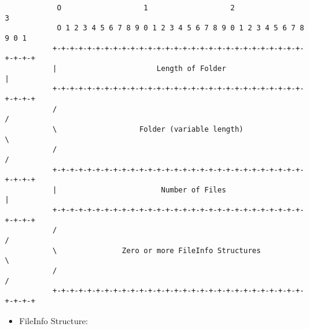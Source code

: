 \begin{verbatim}
            O                   1                   2                   3
            O 1 2 3 4 5 6 7 8 9 0 1 2 3 4 5 6 7 8 9 0 1 2 3 4 5 6 7 8 9 0 1
           +-+-+-+-+-+-+-+-+-+-+-+-+-+-+-+-+-+-+-+-+-+-+-+-+-+-+-+-+-+-+-+-+
           |                       Length of Folder                        |
           +-+-+-+-+-+-+-+-+-+-+-+-+-+-+-+-+-+-+-+-+-+-+-+-+-+-+-+-+-+-+-+-+
           /                                                               /
           \                   Folder (variable length)                    \
           /                                                               /
           +-+-+-+-+-+-+-+-+-+-+-+-+-+-+-+-+-+-+-+-+-+-+-+-+-+-+-+-+-+-+-+-+
           |                        Number of Files                        |
           +-+-+-+-+-+-+-+-+-+-+-+-+-+-+-+-+-+-+-+-+-+-+-+-+-+-+-+-+-+-+-+-+
           /                                                               /
           \               Zero or more FileInfo Structures                \
           /                                                               /
           +-+-+-+-+-+-+-+-+-+-+-+-+-+-+-+-+-+-+-+-+-+-+-+-+-+-+-+-+-+-+-+-+
\end{verbatim}

\begin{itemize}
 \item FileInfo Structure:
\end{itemize}

